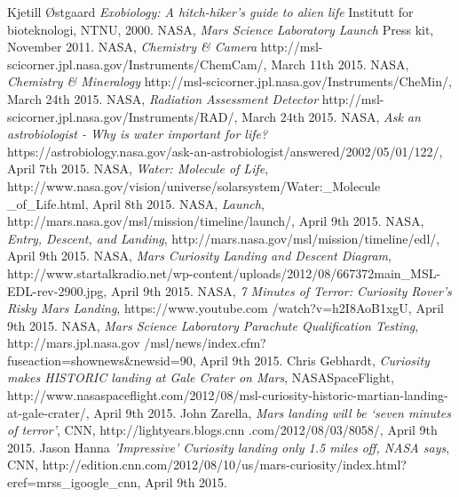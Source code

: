 \begin{thebibliography}{99}	%
		Kjetill Østgaard
		\emph{Exobiology: A hitch-hiker's guide to alien life}
		Institutt for bioteknologi,
		NTNU,
		2000.
		NASA,
		\emph{Mars Science Laboratory Launch}
		Press kit,
		November 2011.
		NASA,
		\emph{Chemistry \& Camera}
		http://msl-scicorner.jpl.nasa.gov/Instruments/ChemCam/,
		March 11th 2015.
		NASA,
		\emph{Chemistry \& Mineralogy}
		http://msl-scicorner.jpl.nasa.gov/Instruments/CheMin/,
		March 24th 2015.
		NASA,
		\emph{Radiation Assessment Detector}
		http://msl-scicorner.jpl.nasa.gov/Instruments/RAD/,
		March 24th 2015.
		NASA,
		\emph{Ask an astrobiologist - Why is water important for life?}
		https://astrobiology.nasa.gov/ask-an-astrobiologist/answered/2002/05/01/122/,
		April 7th 2015.
		NASA,
		\emph{Water: Molecule of Life},
		http://www.nasa.gov/vision/universe/solarsystem/Water:\_Molecule \_of\_Life.html,
		April 8th 2015.
		NASA,
		\emph{Launch},
		http://mars.nasa.gov/msl/mission/timeline/launch/,
		April 9th 2015.
		NASA,
		\emph{Entry, Descent, and Landing},
		http://mars.nasa.gov/msl/mission/timeline/edl/,
		April 9th 2015.
		NASA,
		\emph{Mars Curiosity Landing and Descent Diagram},
		http://www.startalkradio.net/wp-content/uploads/2012/08/667372main\_MSL-EDL-rev-2900.jpg,
		April 9th 2015.
		NASA,
		\emph{7 Minutes of Terror: Curiosity Rover's Risky Mars Landing},
		https://www.youtube.com /watch?v=h2I8AoB1xgU,
		April 9th 2015.
		NASA,
		\emph{Mars Science Laboratory Parachute Qualification Testing},
		http://mars.jpl.nasa.gov /msl/news/index.cfm?fuseaction=shownews\&newsid=90,
		April 9th 2015.
		Chris Gebhardt,
		\emph{Curiosity makes HISTORIC landing at Gale Crater on Mars},
		NASASpaceFlight,
		http://www.nasaspaceflight.com/2012/08/msl-curiosity-historic-martian-landing-at-gale-crater/,
		April 9th 2015.
		John Zarella,
		\emph{Mars landing will be ‘seven minutes of terror’},
		CNN,
		http://lightyears.blogs.cnn .com/2012/08/03/8058/,
		April 9th 2015.
		Jason Hanna
		\emph{'Impressive' Curiosity landing only 1.5 miles off, NASA says},
		CNN,
		http://edition.cnn.com/2012/08/10/us/mars-curiosity/index.html?eref=mrss\_igoogle\_cnn,
		April 9th 2015.

\end{thebibliography}
